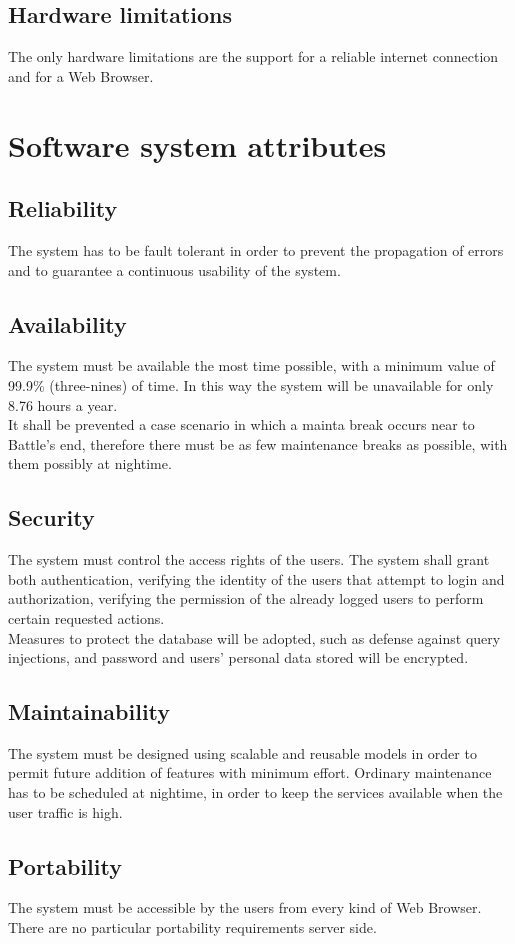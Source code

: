 \subsection{Hardware limitations}
\label{subsec:hardware_limitations}%
The only hardware limitations are the support for a reliable internet connection and for a Web Browser.


\section{Software system attributes}
\label{sec:software_system_attributes}%

\subsection{Reliability}
\label{subsec:reliability}%
The system has to be fault tolerant in order to prevent the propagation of errors and to guarantee a continuous usability of the system.

\subsection{Availability}
\label{subsec:availability}%
The system must be available the most time possible, with a minimum value of 99.9\% (three-nines) of time. In this way the system will be unavailable for only 8.76 hours a year. \\
It shall be prevented a case scenario in which a mainta break occurs near to Battle's end, therefore there must be as few maintenance breaks as possible, with them possibly at nightime.

\subsection{Security}
\label{subsec:security}%
The system must control the access rights of the users. The system shall grant both authentication, verifying the identity of the users that attempt to login and authorization, verifying the permission of the already logged users to perform certain requested actions. \\
Measures to protect the database will be adopted, such as defense against query injections, and password and users' personal data stored will be encrypted.


\subsection{Maintainability}
\label{subsec:maintainability}%
The system must be designed using scalable and reusable models in order to permit future addition of features with minimum effort. 
Ordinary maintenance has to be scheduled at nightime, in order to keep the services available when the user traffic is high.

\subsection{Portability}
\label{subsec:portability}%
The system must be accessible by the users from every kind of Web Browser. 
There are no particular portability requirements server side.



